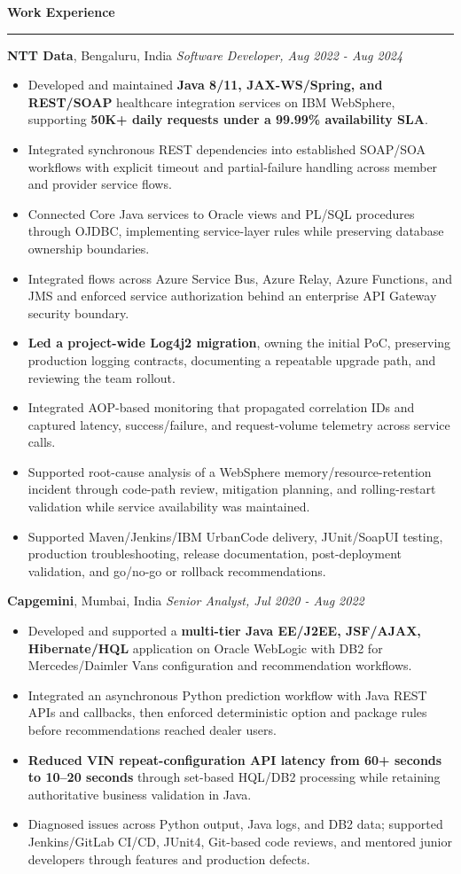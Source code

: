 \documentclass[11pt,letterpaper]{article}
\newcommand{\ressection}[1]{\Needspace{6\baselineskip}\vspace{8pt}\par\textbf{#1}\par\vspace{2pt}\hrule\vspace{5pt}}
\begin{document}
\ressection{Work Experience}
\textbf{NTT Data}, Bengaluru, India \hfill \textit{Software Developer, Aug 2022 - Aug 2024}
\begin{itemize}
  \item Developed and maintained \textbf{Java 8/11, JAX-WS/Spring, and REST/SOAP} healthcare integration services on IBM WebSphere, supporting \textbf{50K+ daily requests under a 99.99\% availability SLA}.
  \item Integrated synchronous REST dependencies into established SOAP/SOA workflows with explicit timeout and partial-failure handling across member and provider service flows.
  \item Connected Core Java services to Oracle views and PL/SQL procedures through OJDBC, implementing service-layer rules while preserving database ownership boundaries.
  \item Integrated flows across Azure Service Bus, Azure Relay, Azure Functions, and JMS and enforced service authorization behind an enterprise API Gateway security boundary.
  \item \textbf{Led a project-wide Log4j2 migration}, owning the initial PoC, preserving production logging contracts, documenting a repeatable upgrade path, and reviewing the team rollout.
  \item Integrated AOP-based monitoring that propagated correlation IDs and captured latency, success/failure, and request-volume telemetry across service calls.
  \item Supported root-cause analysis of a WebSphere memory/resource-retention incident through code-path review, mitigation planning, and rolling-restart validation while service availability was maintained.
  \item Supported Maven/Jenkins/IBM UrbanCode delivery, JUnit/SoapUI testing, production troubleshooting, release documentation, post-deployment validation, and go/no-go or rollback recommendations.
\end{itemize}
\textbf{Capgemini}, Mumbai, India \hfill \textit{Senior Analyst, Jul 2020 - Aug 2022}
\begin{itemize}
  \item Developed and supported a \textbf{multi-tier Java EE/J2EE, JSF/AJAX, Hibernate/HQL} application on Oracle WebLogic with DB2 for Mercedes/Daimler Vans configuration and recommendation workflows.
  \item Integrated an asynchronous Python prediction workflow with Java REST APIs and callbacks, then enforced deterministic option and package rules before recommendations reached dealer users.
  \item \textbf{Reduced VIN repeat-configuration API latency from 60+ seconds to 10--20 seconds} through set-based HQL/DB2 processing while retaining authoritative business validation in Java.
  \item Diagnosed issues across Python output, Java logs, and DB2 data; supported Jenkins/GitLab CI/CD, JUnit4, Git-based code reviews, and mentored junior developers through features and production defects.
\end{itemize}
\end{document}
